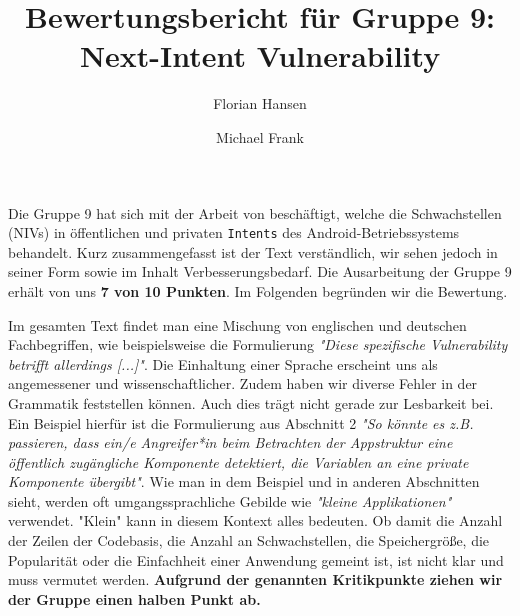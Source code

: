 \documentclass{article}
\author{Florian Hansen \and Michael Frank}
\title{Bewertungsbericht für Gruppe 9: Next-Intent Vulnerability}
\begin{document}
  \maketitle

  Die Gruppe 9 hat sich mit der Arbeit von \cite{El-Zawawy2020} beschäftigt,
  welche die Schwachstellen (NIVs) in öffentlichen und privaten \texttt{Intents}
  des Android-Betriebssystems behandelt. Kurz zusammengefasst ist der Text
  verständlich, wir sehen jedoch in seiner Form sowie im Inhalt
  Verbesserungsbedarf. Die Ausarbeitung der Gruppe 9 erhält von uns \textbf{7
  von 10 Punkten}. Im Folgenden begründen wir die Bewertung.

  Im gesamten Text findet man eine Mischung von englischen und deutschen
  Fachbegriffen, wie beispielsweise die Formulierung \textit{"Diese spezifische
  Vulnerability betrifft allerdings [...]"}. Die Einhaltung einer Sprache
  erscheint uns als angemessener und wissenschaftlicher. Zudem haben wir
  diverse Fehler in der Grammatik feststellen können. Auch dies trägt nicht
  gerade zur Lesbarkeit bei. Ein Beispiel hierfür ist die Formulierung aus
  Abschnitt 2 \textit{"So könnte es z.B. passieren, dass ein/e Angreifer*in beim
  Betrachten der Appstruktur eine öffentlich zugängliche Komponente
  detektiert, die Variablen an eine private Komponente übergibt"}. Wie man in
  dem Beispiel und in anderen Abschnitten sieht, werden oft umgangssprachliche
  Gebilde wie \textit{"kleine Applikationen"} verwendet. "Klein" kann in
  diesem Kontext alles bedeuten. Ob damit die Anzahl der Zeilen der Codebasis,
  die Anzahl an Schwachstellen, die Speichergröße, die Popularität oder
  die Einfachheit einer Anwendung gemeint ist, ist nicht klar und muss vermutet
  werden. \textbf{Aufgrund der genannten Kritikpunkte ziehen wir der Gruppe einen 
  halben Punkt ab.}
\end{document}
